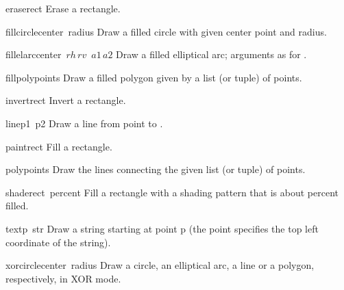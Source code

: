 \begin{funcdesc}{erase}{rect}
Erase a rectangle.
\end{funcdesc}

\begin{funcdesc}{fillcircle}{center\, radius}
Draw a filled circle with given center point and radius.
\end{funcdesc}

\begin{funcdesc}{fillelarc}{center\, \(rh\, rv\)\, \(a1\, a2\)}
Draw a filled elliptical arc; arguments as for .
\end{funcdesc}

\begin{funcdesc}{fillpoly}{points}
Draw a filled polygon given by a list (or tuple) of points.
\end{funcdesc}

\begin{funcdesc}{invert}{rect}
Invert a rectangle.
\end{funcdesc}

\begin{funcdesc}{line}{p1\, p2}
Draw a line from point
to
.
\end{funcdesc}

\begin{funcdesc}{paint}{rect}
Fill a rectangle.
\end{funcdesc}

\begin{funcdesc}{poly}{points}
Draw the lines connecting the given list (or tuple) of points.
\end{funcdesc}

\begin{funcdesc}{shade}{rect\, percent}
Fill a rectangle with a shading pattern that is about
percent filled.
\end{funcdesc}

\begin{funcdesc}{text}{p\, str}
Draw a string starting at point p (the point specifies the
top left coordinate of the string).
\end{funcdesc}

\begin{funcdesc}{xorcircle}{center\, radius}
Draw a circle, an elliptical arc, a line or a polygon, respectively,
in XOR mode.
\end{funcdesc}

